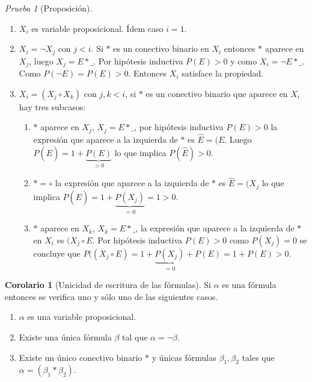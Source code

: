 \documentclass[a4paper,11pt]{article}
\theoremstyle{definition}
\newtheorem{coro}{Corolario}[section]
\theoremstyle{remark}
\newtheorem*{prue}{Prueba}
\begin{document}
\begin{prue}[Proposición]
\begin{itemize}
\begin{enumerate}[label=\alph*)]
\item $X_i$ es variable proposicional. Ídem caso $i=1$.
\item $X_i = \neg X_j$ con $j < i$. Si $*$ es un conectivo binario en $X_i$
entonces $*$ aparece en $X_j$, luego $X_j = E*\_$. Por hipótesis inductiva
$P(E) > 0$ y como $X_i = \neg E * \_$. Como $P(\neg E) = P(E) > 0$. Entonces
$X_i$ satisface la propiedad.
\item $X_i = (X_j \circ X_k)$ con $j,k < i$, si $*$ es un conectivo binario
que aparece en $X_i$ hay tres subcasos:
\begin{enumerate}[label=\roman*)]
\item $*$ aparece en $X_j$, $X_j = E*\_$, por hipótesis inductiva $P(E) > 0$ la
expresión que aparece a la izquierda de $*$ es $\hat E = (E$. Luego
$P(\hat E) = 1 + \underbrace{P(E)}_{> 0}$ lo que implica $P(\hat E) > 0$.
\item $* = \circ$ la expresión que aparece a la izquierda de $*$ es 
$\hat E = (X_j$ lo que implica $P(\hat E) = 1 + \underbrace{P(X_j)}_{=0} = 1 > 0$.
\item $*$ aparece en $X_k$, $X_k = E*\_$, la expresión que aparece a la 
izquierda de $*$ en $X_i$ es $(X_j \circ E$. Por hipótesis inductiva
$P(E) > 0$ como $P(X_j) = 0$ se concluye que 
$P((X_j\circ E) = 1 + \underbrace{P(X_j)}_{=0} + P(E) = 1 + P(E) > 0$.
\end{enumerate}
\end{enumerate}
\end{itemize}
\end{prue}

\begin{coro}[Unicidad de escritura de las fórmulas]
Si $\alpha$ es una fórmula entonces se verifica uno y sólo uno de las
siguientes casos.

\begin{enumerate}
\item $\alpha$ es una variable proposicional.
\item Existe una única fórmula $\beta$ tal que $\alpha = \neg \beta$.
\item Existe un único conectivo binario $*$ y únicas fórmulas $\beta_1, \beta_2$
tales que $\alpha = (\beta_1 * \beta_2)$.
\end{enumerate}
\end{coro}
\end{document}
